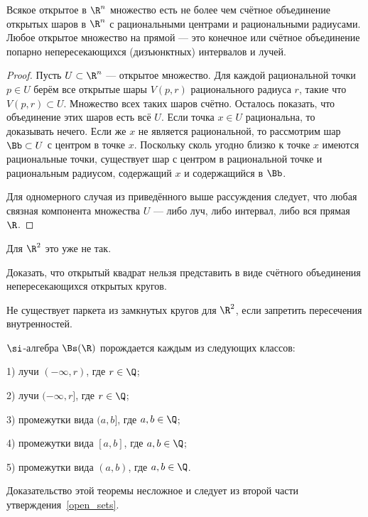 \documentclass[10pt]{article}
\begin{document}
\begin{stm}\label{open_sets}
Всякое открытое в $\R^n$ множество есть не более чем счётное
объединение открытых шаров в $\R^n$ с рациональными центрами и
рациональными радиусами. Любое открытое множество на прямой --- это
конечное или счётное объединение попарно непересекающихся
(дизъюнктных) интервалов и лучей.
\end{stm}

\begin{proof}
Пусть $U\subset \R^n$ --- открытое множество. Для каждой
рациональной точки $p\in U$ берём все открытые шары $V(p,r)$
рационального радиуса $r$, такие что $V(p,r)\subset U$. Множество
всех таких шаров счётно. Осталось показать, что объединение этих
шаров есть всё $U$. Если точка $x\in U$ рациональна, то доказывать
нечего. Если же $x$ не является рациональной, то рассмотрим шар
$\Bb\subset U$ с центром в точке $x$. Поскольку сколь угодно близко
к точке $x$ имеются рациональные точки, существует шар с центром в
рациональной точке и рациональным радиусом, содержащий $x$ и
содержащийся в $\Bb$.

Для одномерного случая из приведённого выше рассуждения следует, что
любая связная компонента множества $U$ --- либо луч, либо интервал,
либо вся прямая $\R$.
\end{proof}

\begin{note}
Для $\R^2$ это уже не так.
\end{note}

\begin{problem}
Доказать, что открытый квадрат нельзя представить в виде счётного
объединения непересекающихся открытых кругов.
\end{problem}
\begin{problem}
Не существует паркета из замкнутых кругов для $\R^2$, если запретить
пересечения внутренностей.
\end{problem}

\begin{theorem}\label{borel_alg}
$\si$-алгебра $\Bs(\R)$ порождается каждым из следующих классов:

1) лучи $(-\infty,r)$, где $r\in\Q$;

2) лучи $(-\infty,r]$, где $r\in\Q$;

3) промежутки вида $(a,b]$, где $a,b\in\Q$;

4) промежутки вида $[a,b]$, где $a,b\in\Q$;

5) промежутки вида $(a,b)$, где $a,b\in\Q$.
\end{theorem}
Доказательство этой теоремы несложное и следует из второй части
утверждения~\ref{open_sets}.
\end{document}
